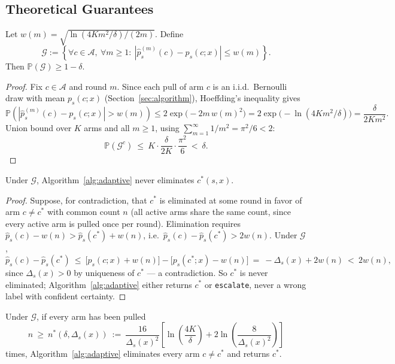 \subsection{Theoretical Guarantees}
\label{sec:theory}

\begin{lemma}
\label{lem:good-event}
Let $w(m) = \sqrt{\ln(4Km^2/\delta)/(2m)}$. Define
$$
\mathcal{G} := \left\{ \forall c \in \mathcal{A},\ \forall m \geq 1: \ |\hat p_s^{(m)}(c) - p_s(c;x)| \leq w(m) \right\}.
$$
Then $\mathbb{P}(\mathcal{G}) \geq 1 - \delta$.
\end{lemma}

\begin{proof}
Fix $c \in \mathcal{A}$ and round $m$. Since each pull of arm $c$ is an i.i.d.\ Bernoulli draw with mean $p_s(c;x)$ (Section~\ref{sec:algorithm}), Hoeffding's inequality gives
$$
\mathbb{P}\!\left(|\hat p_s^{(m)}(c) - p_s(c;x)| > w(m)\right) \leq 2\exp\!\big(-2m\,w(m)^2\big) = 2\exp\!\big(-\ln(4Km^2/\delta)\big) = \frac{\delta}{2Km^2}.
$$
Union bound over $K$ arms and all $m \geq 1$, using $\sum_{m=1}^\infty 1/m^2 = \pi^2/6 < 2$:
$$
\mathbb{P}(\mathcal{G}^c) \ \leq\ K \cdot \frac{\delta}{2K} \cdot \frac{\pi^2}{6} \ <\ \delta.
$$
\end{proof}

\begin{proposition}
\label{prop:correctness}
Under $\mathcal{G}$, Algorithm~\ref{alg:adaptive} never eliminates $c^*(s,x)$.
\end{proposition}

\begin{proof}
Suppose, for contradiction, that $c^*$ is eliminated at some round in favor of arm $c \neq c^*$ with common count $n$ (all active arms share the same count, since every active arm is pulled once per round). Elimination requires $\hat p_s(c) - w(n) > \hat p_s(c^*) + w(n)$, i.e.\ $\hat p_s(c) - \hat p_s(c^*) > 2w(n)$. Under $\mathcal{G}$,
$$
\hat p_s(c) - \hat p_s(c^*) \ \leq\ \big[p_s(c;x) + w(n)\big] - \big[p_s(c^*;x) - w(n)\big] \ =\ -\Delta_s(x) + 2w(n) \ <\ 2w(n),
$$
since $\Delta_s(x) > 0$ by uniqueness of $c^*$ — a contradiction. So $c^*$ is never eliminated; Algorithm~\ref{alg:adaptive} either returns $c^*$ or \texttt{escalate}, never a wrong label with confident certainty.
\end{proof}

\begin{theorem}
\label{thm:sample-complexity}
Under $\mathcal{G}$, if every arm has been pulled
$$
n \ \geq\ n^*(\delta, \Delta_s(x)) \ :=\ \frac{16}{\Delta_s(x)^2}\left[\ln\!\left(\frac{4K}{\delta}\right) + 2\ln\!\left(\frac{8}{\Delta_s(x)^2}\right)\right]
$$
times, Algorithm~\ref{alg:adaptive} eliminates every arm $c \neq c^*$ and returns $c^*$.
\end{theorem}


